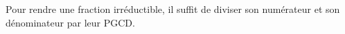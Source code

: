 
Pour rendre une fraction irréductible, il suffit de diviser son numérateur et son dénominateur par leur PGCD. 
 

